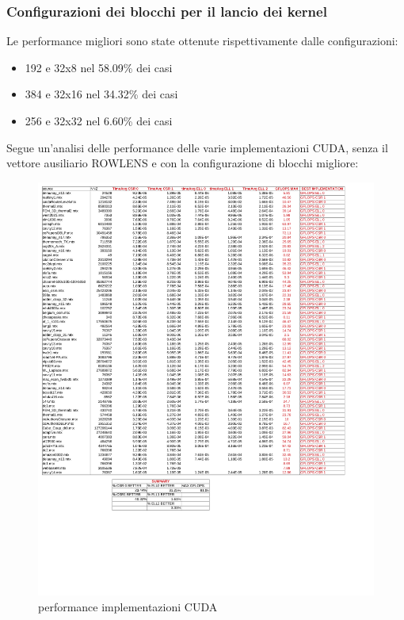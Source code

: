 \documentclass[acmsmall,nonacm=true]{acmart}
\begin{document}
\subsubsection{Configurazioni dei blocchi per il lancio dei kernel}
Le performance migliori sono state ottenute rispettivamente dalle configurazioni:\\
\begin{itemize}
 \item 192 e 32x8  nel 58.09\% dei casi
 \item 384 e 32x16 nel 34.32\% dei casi
 \item 256 e 32x32 nel  6.60\% dei casi
\end{itemize}


Segue un'analisi delle performance delle varie implementazioni CUDA, senza il vettore ausiliario ROWLENS
e con la configurazione di blocchi migliore: %

\begin{figure}[h] \label{cudaNoRowLens_192_8}
    \centering
    \includegraphics[scale=0.48]{cudaNoRowLens_192_8.pdf}
    \caption{performance implementazioni CUDA}
\end{figure}
\clearpage
\end{document}
